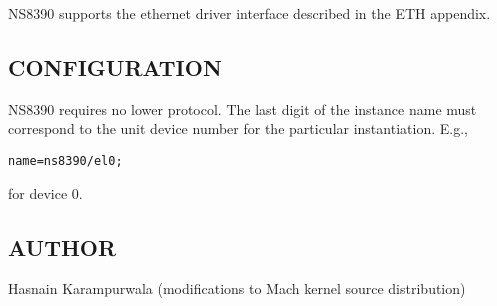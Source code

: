 NS8390 supports the ethernet driver interface
described in the ETH appendix.


\subsection*{CONFIGURATION}

NS8390 requires no lower protocol.  The last digit of the instance
name must correspond to the unit device number for the particular
instantiation.  E.g., 

\medskip

{\tt name=ns8390/el0;}

\medskip

\noindent for device 0.


\subsection*{AUTHOR}

\noindent Hasnain Karampurwala (modifications to Mach
kernel source distribution)

